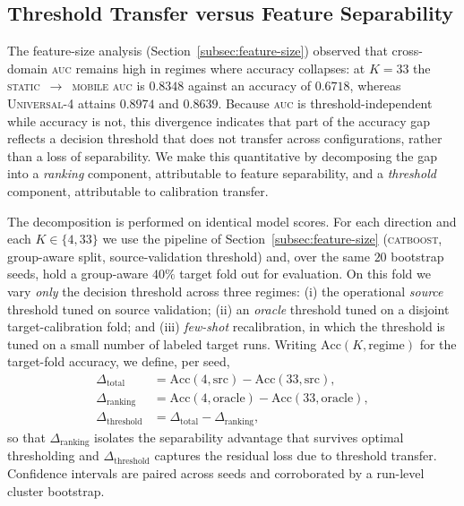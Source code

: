 \subsection{Threshold Transfer versus Feature Separability}
\label{subsec:threshold-decomposition}

The feature-size analysis (Section~\ref{subsec:feature-size}) observed that
cross-domain \textsc{auc} remains high in regimes where accuracy collapses: at
$K=33$ the \textsc{static}~$\rightarrow$~\textsc{mobile} \textsc{auc} is $0.8348$
against an accuracy of $0.6718$, whereas \textsc{Universal-4} attains $0.8974$ and
$0.8639$. Because \textsc{auc} is threshold-independent while accuracy is not, this
divergence indicates that part of the accuracy gap reflects a decision threshold
that does not transfer across configurations, rather than a loss of separability.
We make this quantitative by decomposing the gap into a \emph{ranking} component,
attributable to feature separability, and a \emph{threshold} component,
attributable to calibration transfer.

The decomposition is performed on identical model scores. For each direction and
each $K\in\{4,33\}$ we use the pipeline of Section~\ref{subsec:feature-size}
(\textsc{catboost}, group-aware split, source-validation threshold) and, over the
same $20$ bootstrap seeds, hold a group-aware $40\%$ target fold out for
evaluation. On this fold we vary \emph{only} the decision threshold across three
regimes: (i) the operational \emph{source} threshold tuned on source validation;
(ii) an \emph{oracle} threshold tuned on a disjoint target-calibration fold; and
(iii) \emph{few-shot} recalibration, in which the threshold is tuned on a small
number of labeled target runs. Writing $\mathrm{Acc}(K,\text{regime})$ for the
target-fold accuracy, we define, per seed,
\begin{align}
\Delta_{\text{total}}     &= \mathrm{Acc}(4,\text{src}) - \mathrm{Acc}(33,\text{src}),\\
\Delta_{\text{ranking}}   &= \mathrm{Acc}(4,\text{oracle}) - \mathrm{Acc}(33,\text{oracle}),\\
\Delta_{\text{threshold}} &= \Delta_{\text{total}} - \Delta_{\text{ranking}},
\end{align}
so that $\Delta_{\text{ranking}}$ isolates the separability advantage that survives
optimal thresholding and $\Delta_{\text{threshold}}$ captures the residual loss due
to threshold transfer. Confidence intervals are paired across seeds and corroborated
by a run-level cluster bootstrap.

